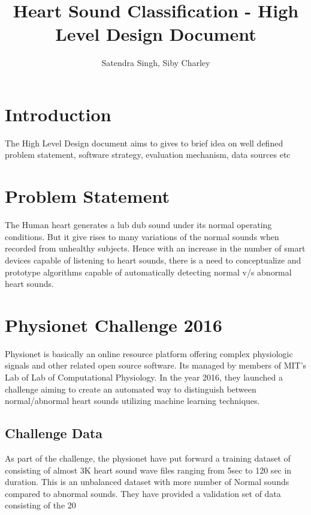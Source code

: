 \documentclass[12pt]{article}
\title{Heart Sound Classification - High Level Design Document}
\author{Satendra Singh, Siby Charley}
\begin{document}
\begin{titlepage}
\maketitle
\end{titlepage}

\tableofcontents

\pagebreak

\section{Introduction}
The High Level Design document aims to gives to brief idea on well defined problem statement, software strategy, evaluation mechanism, data sources etc

\section{Problem Statement}
The Human heart generates a lub dub sound under its normal operating conditions. But it give rises to many variations of the normal sounds when recorded from unhealthy subjects. Hence with an increase in the number of smart devices capable of listening to heart sounds, there is a need to conceptualize and prototype algorithms capable of automatically detecting normal v/s abnormal heart sounds.   

\section{Physionet Challenge 2016}
Physionet is basically an online resource platform offering complex physiologic signals and other related open source software. Its managed by members of MIT's Lab of Lab of Computational Physiology. In the year 2016, they launched a challenge aiming to create an automated way to distinguish between normal/abnormal heart sounds utilizing machine learning techniques.

\subsection{Challenge Data}
As part of the challenge, the physionet have put forward a training dataset of consisting of almost 3K heart sound wave files ranging from 5sec to 120 sec in duration. This is an unbalanced dataset with more number of Normal sounds compared to abnormal sounds. They have provided a validation set of data consisting of the 20%
\end{document}
